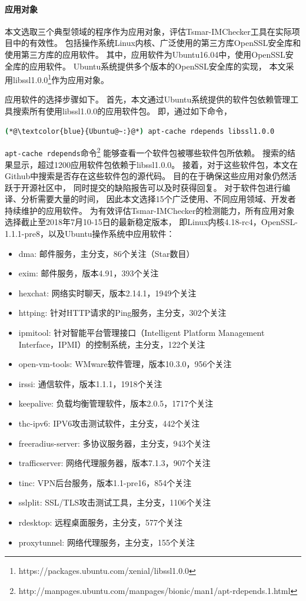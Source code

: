 \paragraph{应用对象}
本文选取三个典型领域的程序作为应用对象，评估Tsmar-IMChecker工具在实际项目中的有效性。
包括操作系统Linux内核、广泛使用的第三方库OpenSSL安全库和
使用第三方库的应用软件。
其中，应用软件为Ubuntu16.04中，使用OpenSSL安全库的应用软件。
Ubuntu系统提供多个版本的OpenSSL安全库的实现，
本文采用libssl1.0.0\footnote{https://packages.ubuntu.com/xenial/libssl1.0.0}作为应用对象。

应用软件的选择步骤如下。
首先，本文通过Ubuntu系统提供的软件包依赖管理工具搜索所有使用libssl1.0.0的应用软件包。
即，通过如下命令，
\begin{lstlisting}[language={bash},
basicstyle=\linespread{0.8}\listingsfont,
numbers=none,
xleftmargin=.25\textwidth]
(*@\textcolor{blue}{Ubuntu@~:}@*) apt-cache rdepends libssl1.0.0
\end{lstlisting}
\texttt{apt-cache rdepends}命令\footnote{http://manpages.ubuntu.com/manpages/bionic/man1/apt-rdepends.1.html}
能够查看一个软件包被哪些软件包所依赖。
搜索的结果显示，超过1200应用软件包依赖于libssl1.0.0。
接着，对于这些软件包，本文在Github中搜索是否存在这些软件包的源代码。
目的在于确保这些应用对象仍然活跃于开源社区中，
同时提交的缺陷报告可以及时获得回复。
对于软件包进行编译、分析需要大量的时间，
因此本文选择15个广泛使用、不同应用领域、开发者持续维护的应用软件。
为有效评估Tsmar-IMChecker的检测能力，所有应用对象选择截止至2018年7月10-15日的最新稳定版本，
即Linux内核4.18-rc4，OpenSSL-1.1.1-pre8，以及Ubuntu操作系统中应用软件：
\begin{itemize}
	\item dma: 邮件服务，主分支，86个关注（Star数目）
	\item exim: 邮件服务，版本4.91，393个关注
	\item hexchat: 网络实时聊天，版本2.14.1，1949个关注
	\item httping: 针对HTTP请求的Ping服务，主分支，302个关注
	\item ipmitool: 针对智能平台管理接口（Intelligent Platform Management Interface，IPMI）的控制系统，主分支，122个关注
	\item open-vm-tools: WMware软件管理，版本10.3.0，956个关注
	\item irssi: 通信软件，版本1.1.1，1918个关注
	\item keepalive: 负载均衡管理软件，版本2.0.5，1717个关注
	\item thc-ipv6: IPV6攻击测试软件，主分支，442个关注
	\item freeradius-server: 多协议服务器，主分支，943个关注
	\item trafficserver: 网络代理服务器，版本7.1.3，907个关注
	\item tinc: VPN后台服务，版本1.1-pre16，854个关注
	\item sslplit: SSL/TLS攻击测试工具，主分支，1106个关注
	\item rdesktop: 远程桌面服务，主分支，577个关注
	\item proxytunnel: 网络代理服务，主分支，155个关注
\end{itemize}

